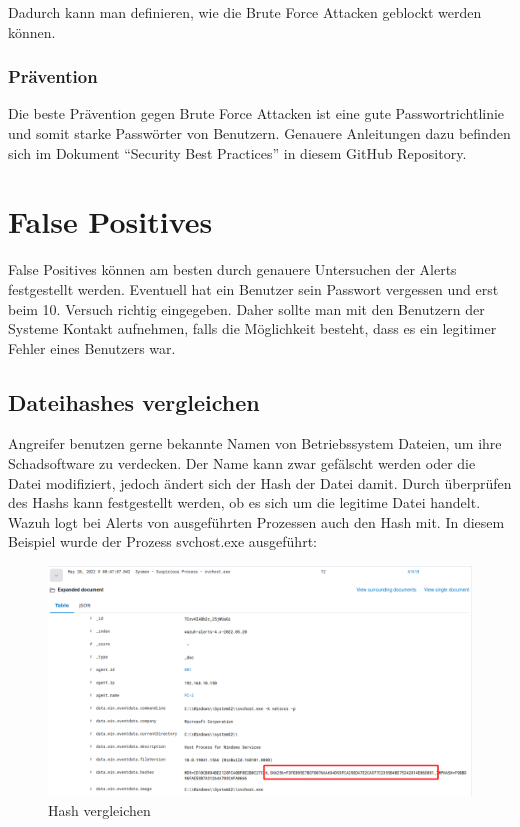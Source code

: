 Dadurch kann man definieren, wie die Brute Force Attacken geblockt werden können.

\subsubsection{Prävention}
Die beste Prävention gegen Brute Force Attacken ist eine gute Passwortrichtlinie und somit starke Passwörter von Benutzern.
Genauere Anleitungen dazu befinden sich im Dokument ``Security Best Practices'' in diesem GitHub Repository.

\section{False Positives}
False Positives können am besten durch genauere Untersuchen der Alerts festgestellt werden.
Eventuell hat ein Benutzer sein Passwort vergessen und erst beim 10. Versuch richtig eingegeben.
Daher sollte man mit den Benutzern der Systeme Kontakt aufnehmen, falls die Möglichkeit besteht, dass es ein legitimer Fehler eines Benutzers war.  

\subsection{Dateihashes vergleichen}
Angreifer benutzen gerne bekannte Namen von Betriebssystem Dateien, um ihre Schadsoftware zu verdecken.
Der Name kann zwar gefälscht werden oder die Datei modifiziert, jedoch ändert sich der Hash der Datei damit.
Durch überprüfen des Hashs kann festgestellt werden, ob es sich um die legitime Datei handelt. \\

Wazuh logt bei Alerts von ausgeführten Prozessen auch den Hash mit.
In diesem Beispiel wurde der Prozess svchost.exe ausgeführt:
\begin{figure}[H]
    \centering
    \includegraphics[width=\linewidth]{../img/check-hash-1.png}
    \caption{Hash vergleichen}
\end{figure}


